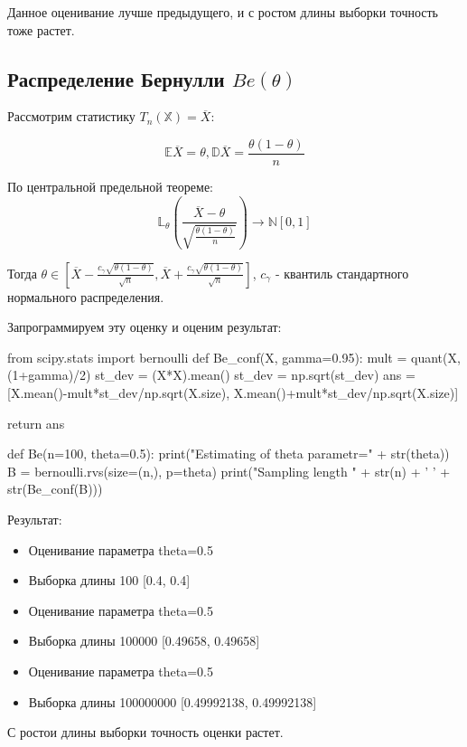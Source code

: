 \documentclass{article}
\begin{document}
Данное оценивание лучше предыдущего, и с ростом длины выборки точность тоже растет.
\subsection{Распределение Бернулли $Be(\theta)$}

Рассмотрим статистику $T_n\left(\mathbb{X}\right)=\overline{X}$:

\[\mathbb{E}\overline{X} = \theta, \mathbb{D}\overline{X}=\frac{\theta(1-\theta)}{n}\]

По центральной предельной теореме:
\[\mathbb{L}_\theta\left(\frac{\overline{X}-\theta}{\sqrt{\frac{\theta(1-\theta)}{n}}}\right)\to\mathbb{N}[0, 1]\]

Тогда $\theta \in \left[\overline{X}-\frac{c_\gamma\sqrt{\theta(1-\theta)}}{\sqrt{n}}, \overline{X}+\frac{c_\gamma\sqrt{\theta(1-\theta)}}{\sqrt{n}}\right]$, $c_\gamma$ - квантиль стандартного нормального распределения.

Запрограммируем эту оценку и оценим результат:
\begin{python}
from scipy.stats import bernoulli
def Be_conf(X, gamma=0.95):
	mult = quant(X, (1+gamma)/2)
	st_dev = (X*X).mean()
	st_dev = np.sqrt(st_dev)
	ans = [X.mean()-mult*st_dev/np.sqrt(X.size), X.mean()+mult*st_dev/np.sqrt(X.size)]

	return ans

def Be(n=100, theta=0.5):
	print("Estimating of theta parametr=" + str(theta))
	B = bernoulli.rvs(size=(n,), p=theta)
	print("Sampling length " + str(n) + ' ' + str(Be_conf(B)))	
\end{python}

Результат:
\begin{itemize}
	\item Оценивание параметра theta=0.5
	\item Выборка длины 100 [0.4, 0.4]
	\item Оценивание параметра theta=0.5
	\item Выборка длины 100000 [0.49658, 0.49658]
	\item Оценивание параметра theta=0.5
	\item Выборка длины 100000000 [0.49992138, 0.49992138]
\end{itemize}

С ростои длины выборки точность оценки растет.
\end{document}
